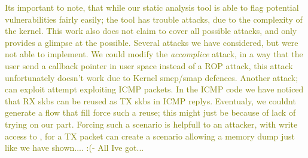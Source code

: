 \smallskip
\textcolor{olive}{Its important to note, that while our static analysis tool is able to flag potential \simple vulnerabilities fairly easily; the tool has trouble \compound attacks, due to the complexity of the kernel. This work also does not claim to cover all possible \compound attacks, and only provides a glimpse at the possible. Several attacks we have considered, but were not able to implement. We could modify the \emph{accomplice} attack, in a way that the user send a callback pointer in user space instead of a ROP attack, this attack unfortunately doesn't work due to Kernel smep/smap defences. Another attack; can exploit attempt exploiting ICMP packets. In the ICMP code we have noticed that RX skbs can be reused as TX skbs in ICMP replys. Eventualy, we couldnt generate a flow that fill force such a reuse; this might just be because of lack of trying on our part. Forcing such a scenario is helpfull to an attacker, with write access to \shinfo{}, for a TX packet can create a scenario allowing a memory dump just like we have shown.... :(- All Ive got... }
